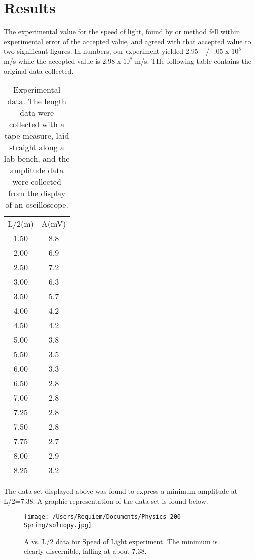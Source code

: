 \documentclass[aps,pre,twocolumn,nofootinbib]{revtex4}
\begin{document}
\section{Results}
The experimental value for the speed of light, found by or method fell within experimental error of the accepted value, and agreed with that accepted value to two significant figures.  In numbers, our experiment yielded 2.95 +/- .05 x $10^8$ m/s while the accepted value is 2.98 x $10^8$ m/s.  THe following table contains the original data collected.  

\begin{table}[h]
	\caption{Experimental data. The length data were collected with a tape measure, laid straight along a lab bench, and the amplitude data were collected from the display of an oscilloscope.}
\begin{ruledtabular}
	\begin{tabular}{cc} 
	L/2(m) & A(mV) \\
	1.50 & 8.8 \\
	2.00 & 6.9 \\
	2.50 & 7.2 \\
	3.00 & 6.3 \\
	3.50 & 5.7 \\
	4.00 & 4.2 \\
	4.50 & 4.2 \\
	5.00 & 3.8 \\
	5.50 & 3.5 \\
	6.00 & 3.3 \\
	6.50 & 2.8 \\
	7.00 & 2.8 \\
	7.25 & 2.8 \\
	7.50 & 2.8 \\
	7.75 & 2.7 \\
	8.00 & 2.9 \\
	8.25 & 3.2 \\
	\end{tabular}
	\end{ruledtabular}
	\label{original_data}
\end{table}

The data set displayed above was found to express a minimum amplitude at L/2=7.38.  A graphic representation of the data set is found below.  

\begin{figure}[h]
\centering
\texttt{[image: /Users/Requiem/Documents/Physics 200 - Spring/solcopy.jpg]} 
\caption{A vs. L/2 data for Speed of Light experiment.  The minimum is clearly discernible, falling at about 7.38. }
\label{hight}
\end{figure}
\end{document}
